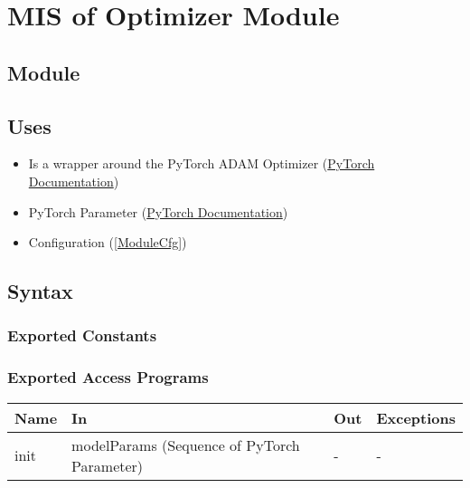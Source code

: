 \documentclass[12pt, titlepage]{article}
\begin{document}
\newpage

\section{MIS of Optimizer Module} \label{ModuleOptim} 

\subsection{Module}



\subsection{Uses}
\begin{itemize}
  \item Is a wrapper around the PyTorch ADAM Optimizer (\href{https://pytorch.org/docs/stable/optim.html}{PyTorch Documentation})
  \item PyTorch Parameter (\href{https://pytorch.org/docs/stable/generated/torch.nn.parameter.Parameter.html}{PyTorch Documentation})
  \item Configuration (\ref{ModuleCfg})
\end{itemize}

\subsection{Syntax}



\subsubsection{Exported Constants}



\subsubsection{Exported Access Programs}

\begin{center}
\begin{tabular}{p{2cm}|p{6cm}|p{2cm}|p{2cm}}
\hline
\textbf{Name} & \textbf{In} & \textbf{Out} & \textbf{Exceptions} \\
\hline
init & modelParams (Sequence of PyTorch Parameter) & - & - \\
\hline
\end{tabular}
\end{center}
\end{document}
